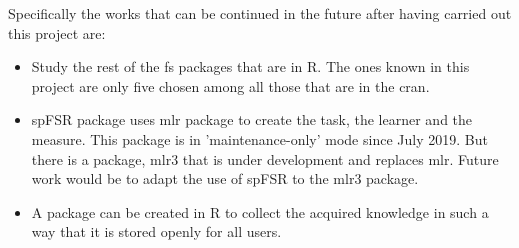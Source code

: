 Specifically the works that can be continued in the future after having carried out this project are:

\begin{itemize}
    \item Study the rest of the \acrshort{fs} packages that are in R. The ones known in this project are only five chosen among all those that are in the \acrshort{cran}.
    
    \item spFSR package uses mlr package to create the task, the learner and the measure. This package is in 'maintenance-only' mode since July 2019. But there is a package, mlr3 that is under development and replaces mlr. Future work would be to adapt the use of spFSR to the mlr3 package.
    
    \item A package can be created in R to collect the acquired knowledge in such a way that it is stored openly for all users.
\end{itemize}

